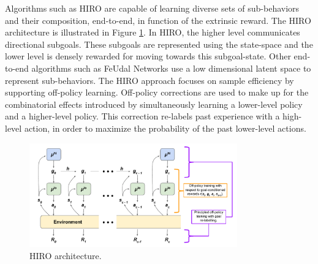 Algorithms such as HIRO \cite{HIRO} are capable of learning diverse sets of sub-behaviors and their composition, end-to-end, in function
of the extrinsic reward. The HIRO architecture is illustrated in Figure \ref{fig:HIRO}.
In HIRO, the higher level communicates directional subgoals. These subgoals are represented using the state-space and the
lower level is densely rewarded for moving towards this subgoal-state. Other end-to-end algorithms such as FeUdal Networks \cite{FuN}
use a low dimensional latent space to represent sub-behaviors.
The HIRO approach focuses on sample efficiency by supporting off-policy learning. Off-policy corrections are used to
make up for the combinatorial effects introduced by simultaneously learning a lower-level policy and a higher-level policy.
This correction re-labels past experience with a high-level action, in order to maximize the probability of the past lower-level actions.

\begin{figure}
    \centering
    \includegraphics[width=0.8\textwidth]{Images/HIRO.png}
    \caption{HIRO architecture.}
    \label{fig:HIRO}
\end{figure}

